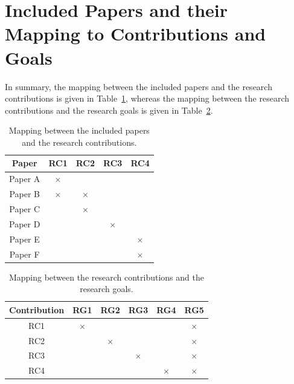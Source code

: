 \section{Included Papers and their Mapping to Contributions and Goals}


In summary, the mapping between the included papers and the research contributions is given in Table~\ref{paper_contribution}, whereas the mapping between the research contributions and the research goals is given in Table~\ref{contribution_goals}.

\begin{table}[h!]
\centering
	\begin{tabular}{@{}ccccc@{}}
		\toprule
		Paper & RC1 & RC2& RC3 & RC4\\ \midrule
		Paper A & $\times$ &  &  &  \\
		Paper B & $\times$ & $\times$ &  &  \\
		Paper C &  & $\times$ &  &  \\
		Paper D &  &  & $\times$  &\\
		Paper E &  &  &  & $\times$ \\
		Paper F &  &  &  & $\times$\\ \bottomrule
	\end{tabular}
\caption{Mapping between the included papers and the research contributions.}\label{paper_contribution}
\end{table}

\begin{table}[h!]
\centering
		\begin{tabular}{@{}cccccc@{}}
		\toprule
		Contribution & RG1 & RG2& RG3 & RG4 & RG5\\ \midrule
		RC1 & $\times$ &  &  &  &$\times$\\
		RC2 &  & $\times$ &  & & $\times$\\
		RC3 &  &  & $\times$ & & $\times$\\
		RC4 &  &  &  & $\times$ &$\times$\\\bottomrule
	\end{tabular}
\caption{Mapping between the research contributions and the research goals.}\label{contribution_goals}
\end{table}
